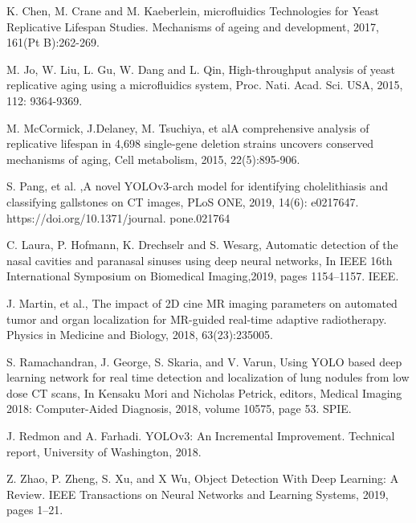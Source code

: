 \documentclass[conference]{IEEEtran}
\begin{document}
\begin{thebibliography}{00}

K. Chen, M. Crane and  M. Kaeberlein, microfluidics Technologies for Yeast Replicative Lifespan Studies. Mechanisms of ageing and development, 2017, 161(Pt B):262-269.



 M. Jo, W. Liu, L. Gu, W. Dang and  L. Qin, High-throughput analysis of yeast replicative aging using a microfluidics system, Proc. Nati. Acad. Sci. USA, 2015, 112: 9364-9369.



M. McCormick,  J.Delaney, M. Tsuchiya, et alA comprehensive analysis of replicative lifespan in 4,698 single-gene deletion strains uncovers conserved mechanisms of aging, Cell metabolism, 2015, 22(5):895-906.


S. Pang,  et al. ,A novel YOLOv3-arch model for identifying cholelithiasis and classifying gallstones on CT images, PLoS ONE, 2019, 14(6): e0217647. https://doi.org/10.1371/journal. pone.021764

C.  Laura, P. Hofmann, K. Drechselr  and S. Wesarg, Automatic detection of the nasal cavities and paranasal sinuses using deep neural networks, In IEEE 16th International Symposium on Biomedical Imaging,2019, pages 1154–1157. IEEE.

J. Martin, et al., The impact of 2D cine MR imaging parameters on automated tumor and organ localization for MR-guided real-time adaptive radiotherapy. Physics in Medicine and Biology, 2018, 63(23):235005.

S. Ramachandran, J. George, S. Skaria, and  V. Varun,  Using YOLO based deep learning network for real time detection and localization of lung nodules from low dose CT scans, In Kensaku Mori and Nicholas Petrick, editors, Medical Imaging 2018: Computer-Aided Diagnosis, 2018, volume 10575, page 53. SPIE.

J. Redmon and A. Farhadi. YOLOv3: An Incremental Improvement. Technical report, University of Washington, 2018.

Z. Zhao, P. Zheng, S. Xu, and X Wu, Object Detection With Deep Learning: A Review. IEEE Transactions on Neural Networks and Learning Systems, 2019, pages 1–21.


\end{thebibliography}



\end{document}
